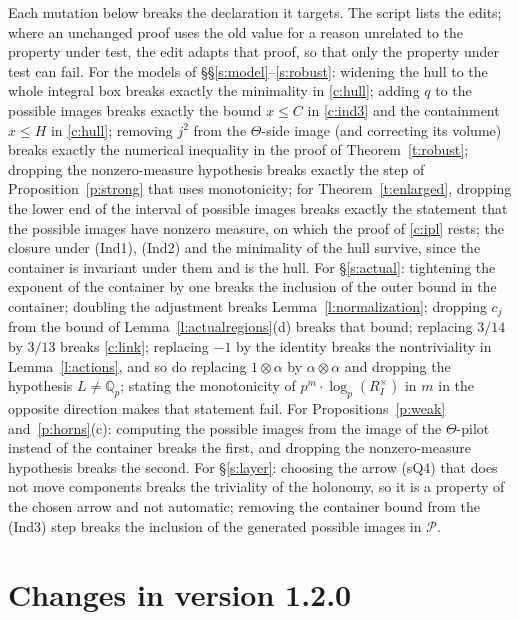 \documentclass[11pt]{article}
\theoremstyle{plain}
\theoremstyle{definition}
\theoremstyle{remark}
\newcommand{\Poss}{\mathcal P}
\newcommand{\Qp}[1]{\mathbb Q_{#1}}
\begin{document}
Each mutation below breaks the declaration it targets. The script lists the edits; where
an unchanged proof uses the old value for a reason unrelated to the property under test,
the edit adapts that proof, so that only the property under test can fail. For the models of
\S\S\ref{s:model}--\ref{s:robust}: widening the hull to the whole integral box breaks
exactly the minimality in \ref{c:hull}; adding $q$ to the possible images breaks exactly
the bound $x\le C$ in \ref{c:ind3} and the containment $x\le H$ in \ref{c:hull}; removing
$j^2$ from the $\Theta$-side image (and correcting its volume) breaks exactly the numerical
inequality in the proof of Theorem~\ref{t:robust}; dropping the nonzero-measure hypothesis
breaks exactly the step of Proposition~\ref{p:strong} that uses monotonicity; for
Theorem~\ref{t:enlarged}, dropping the lower end of the interval of possible images breaks
exactly the statement that the possible images have nonzero measure, on which the proof of
\ref{c:ipl} rests; the closure under (Ind1), (Ind2) and the minimality of the hull survive,
since the container is invariant under them and is the hull. For \S\ref{s:actual}: tightening the exponent of the container by
one breaks the inclusion of the outer bound in the container; doubling the adjustment
breaks Lemma~\ref{l:normalization}; dropping $c_j$ from the bound of
Lemma~\ref{l:actualregions}(d) breaks that bound; replacing $3/14$ by $3/13$ breaks
\ref{c:link}; replacing $-1$ by the identity breaks the nontriviality in
Lemma~\ref{l:actions}, and so do replacing $1\otimes\alpha$ by $\alpha\otimes\alpha$ and
dropping the hypothesis $L\ne\Qp p$; stating the monotonicity of
$p^m\cdot\log_p(R_I^\times)$ in $m$ in the opposite direction makes that statement fail. For Propositions~\ref{p:weak}
and~\ref{p:horns}(c): computing the possible images from the image of the $\Theta$-pilot
instead of the container breaks the first, and dropping the nonzero-measure hypothesis
breaks the second. For \S\ref{s:layer}: choosing the arrow (sQ4) that does not move components
breaks the triviality of the holonomy, so it is a property of the chosen arrow and not
automatic; removing the container bound from the (Ind3) step breaks the inclusion of the
generated possible images in $\Poss$.

\section*{Changes in version 1.2.0}
\end{document}
